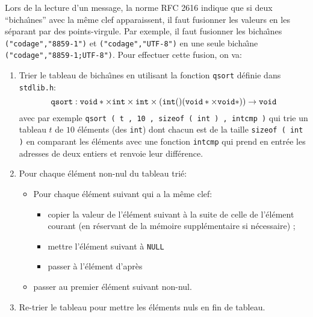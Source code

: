 Lors de la lecture d'un message, la norme \textsf{RFC 2616} indique
que si deux ``bicha{\^\i}nes'' avec la m{\^e}me clef apparaissent, il faut
fusionner les valeurs en les s{\'e}parant par des points-virgule. Par
exemple, il faut fusionner les bicha{\^\i}nes \texttt{("codage","8859-1")}
et \texttt{("codage","UTF-8")} en une seule bicha{\^\i}ne
\texttt{("codage","8859-1;UTF-8")}. Pour effectuer cette fusion, on
va:
\begin{enumerate}
\item Trier le tableau de bicha{\^\i}nes en utilisant la fonction
  \texttt{qsort} d{\'e}finie dans \texttt{stdlib.h}:
$$
\text{\tt qsort}: \text{\tt void} * \times \text{\tt int} \times
\text{\tt int} \times (\text{\tt int} ()( \text{\tt void} * \times
\text{\tt void} * )) \to \text{\tt void}
$$
avec par exemple \texttt{qsort ( t , 10 , sizeof ( int ) , intcmp )}
qui trie un tableau $t$ de $10$ {\'e}l{\'e}ments (des \texttt{int}) dont
chacun est de la taille \texttt{sizeof ( int )} en comparant les
{\'e}l{\'e}ments avec une fonction \texttt{intcmp} qui prend en entr{\'e}e les
adresses de deux entiers et renvoie leur diff{\'e}rence.
\item Pour chaque {\'e}l{\'e}ment non-nul du tableau tri{\'e}:
  \begin{itemize}
  \item Pour chaque {\'e}l{\'e}ment suivant qui a la m{\^e}me clef:
    \begin{itemize}
    \item copier la valeur de l'{\'e}l{\'e}ment suivant {\`a} la suite de celle de
      l'{\'e}l{\'e}ment courant  (en r{\'e}servant de la m{\'e}moire suppl{\'e}mentaire si
      n{\'e}cessaire) ;
    \item mettre l'{\'e}l{\'e}ment suivant {\`a} \texttt{NULL}
    \item passer {\`a} l'{\'e}l{\'e}ment d'apr{\`e}s
    \end{itemize}
  \item passer au premier {\'e}l{\'e}ment suivant non-nul.
  \end{itemize}
\item Re-trier le tableau pour mettre les {\'e}l{\'e}ments nuls en fin de
  tableau.
\end{enumerate}

